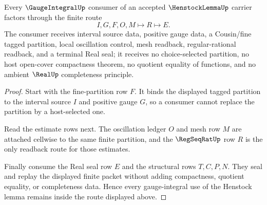 \begin{theorem}
\label{thm:henstock-lemma-finite-gauge-control}
Every $\GaugeIntegralUp$ consumer of an accepted $\HenstockLemmaUp$ carrier factors through the finite route
$$
I,G,F,O,M \longmapsto R \longmapsto E .
$$
The consumer receives interval source data, positive gauge data, a Cousin/fine tagged partition, local oscillation control, mesh readback, regular-rational readback, and a terminal Real seal; it receives no choice-selected partition, no host open-cover compactness theorem, no quotient equality of functions, and no ambient $\RealUp$ completeness principle.
\end{theorem}
\begin{proof}
Start with the fine-partition row $F$. It binds the displayed tagged partition to the interval source $I$ and positive gauge $G$, so a consumer cannot replace the partition by a host-selected one.

Read the estimate rows next. The oscillation ledger $O$ and mesh row $M$ are attached cellwise to the same finite partition, and the $\RegSeqRatUp$ row $R$ is the only readback route for those estimates.

Finally consume the Real seal row $E$ and the structural rows $T,C,P,N$. They seal and replay the displayed finite packet without adding compactness, quotient equality, or completeness data. Hence every gauge-integral use of the Henstock lemma remains inside the route displayed above.
\end{proof}





